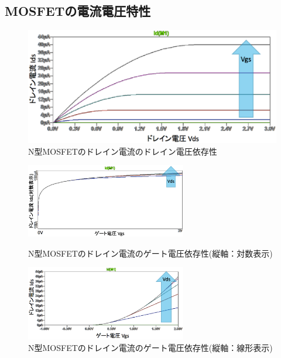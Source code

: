 	\subsection{MOSFETの電流電圧特性}
		\begin{figure}[htbp]
			\begin{center}
				\includegraphics[width=12.0cm]{./Chapter/Chapter3/Picture/MOSFET_N_IdVd.eps}
				\caption{N型MOSFETのドレイン電流のドレイン電圧依存性}
				\label{fig:MOSFET_N_IdVd}
			\end{center}
		\end{figure}
		\begin{figure}[htbp]
			\begin{minipage}{0.5\hsize}
				\begin{center}
					\includegraphics[width=70mm]{./Chapter/Chapter3/Picture/MOSFET_N_IdVg_log.eps}
				\end{center}
				\caption{N型MOSFETのドレイン電流のゲート電圧依存性(縦軸：対数表示)}
				\label{fig:MOSFET_N_IdVg_log}
			\end{minipage}
			\begin{minipage}{0.5\hsize}
				\begin{center}
					\includegraphics[width=70mm]{./Chapter/Chapter3/Picture/MOSFET_N_IdVg_linear.eps}
				\end{center}
				\caption{N型MOSFETのドレイン電流のゲート電圧依存性(縦軸：線形表示)}
				\label{fig:MOSFET_N_IdVg_linear}
			\end{minipage}
		\end{figure}
